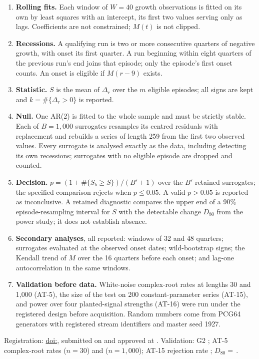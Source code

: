 \documentclass[11pt,a4paper]{article}
\begin{document}
\begin{enumerate}\itemsep2pt
\item \textbf{Rolling fits.} Each window of $W=40$ growth observations is fitted on its own by least squares with an intercept, its first two values serving only as lags. Coefficients are not constrained; $M(t)$ is not clipped.
\item \textbf{Recessions.} A qualifying run is two or more consecutive quarters of negative growth, with onset its first quarter. A run beginning within eight quarters of the previous run's end joins that episode; only the episode's first onset counts. An onset is eligible if $M(r-9)$ exists.
\item \textbf{Statistic.} $S$ is the mean of $\Delta_r$ over the $m$ eligible episodes; all signs are kept and $k=\#\{\Delta_r>0\}$ is reported.
\item \textbf{Null.} One AR(2) is fitted to the whole sample and must be strictly stable. Each of $B=1{,}000$ surrogates resamples its centred residuals with replacement and rebuilds a series of length 259 from the first two observed values. Every surrogate is analysed exactly as the data, including detecting its own recessions; surrogates with no eligible episode are dropped and counted.
\item \textbf{Decision.} $p=(1+\#\{S_b\ge S\})/(B'+1)$ over the $B'$ retained surrogates; the specified comparison rejects when $p\le 0.05$. A valid $p>0.05$ is reported as inconclusive. A retained diagnostic compares the upper end of a 90\% episode-resampling interval for $S$ with the detectable change $D_{80}$ from the power study; it does not establish absence.
\item \textbf{Secondary analyses}, all reported: windows of 32 and 48 quarters; surrogates evaluated at the observed onset dates; wild-bootstrap signs; the Kendall trend of $M$ over the 16 quarters before each onset; and lag-one autocorrelation in the same windows.
\item \textbf{Validation before data.} White-noise complex-root rates at lengths 30 and 1,000 (AT-5), the size of the test on 200 constant-parameter series (AT-15), and power over four planted-signal strengths (AT-16) were run under the registered design before acquisition. Random numbers come from PCG64 generators with registered stream identifiers and master seed 1927.
\end{enumerate}

\noindent Registration: \href{https://doi.org/\DOI}{doi:\DOI}, submitted on \RegistrationSubmitted{} and approved at \RegistrationApproved{}.
Validation: G2 \GtwoStatus; AT-5 complex-root rates \ATfiveThirty{} ($n=30$) and \ATfiveThousand{} ($n=1{,}000$); AT-15 rejection rate \ATfifteen; $D_{80}=\,$\Deighty.
\end{document}
